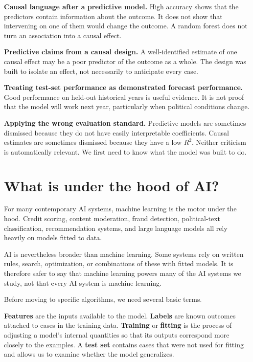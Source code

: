 \documentclass[
  a4paper,
]{scrbook}
\begin{document}
\textbf{Causal language after a predictive model.} High accuracy shows
that the predictors contain information about the outcome. It does not
show that intervening on one of them would change the outcome. A random
forest does not turn an association into a causal effect.

\textbf{Predictive claims from a causal design.} A well-identified
estimate of one causal effect may be a poor predictor of the outcome as
a whole. The design was built to isolate an effect, not necessarily to
anticipate every case.

\textbf{Treating test-set performance as demonstrated forecast
performance.} Good performance on held-out historical years is useful
evidence. It is not proof that the model will work next year,
particularly when political conditions change.

\textbf{Applying the wrong evaluation standard.} Predictive models are
sometimes dismissed because they do not have easily interpretable
coefficients. Causal estimates are sometimes dismissed because they have
a low \(R^2\). Neither criticism is automatically relevant. We first
need to know what the model was built to do.

\section{What is under the hood of
AI?}\label{what-is-under-the-hood-of-ai}

For many contemporary AI systems, machine learning is the motor under
the hood. Credit scoring, content moderation, fraud detection,
political-text classification, recommendation systems, and large
language models all rely heavily on models fitted to data.

AI is nevertheless broader than machine learning. Some systems rely on
written rules, search, optimization, or combinations of these with
fitted models. It is therefore safer to say that machine learning powers
many of the AI systems we study, not that every AI system is machine
learning.

Before moving to specific algorithms, we need several basic terms.

\textbf{Features} are the inputs available to the model. \textbf{Labels}
are known outcomes attached to cases in the training data.
\textbf{Training} or \textbf{fitting} is the process of adjusting a
model's internal quantities so that its outputs correspond more closely
to the examples. A \textbf{test set} contains cases that were not used
for fitting and allows us to examine whether the model generalizes.
\end{document}
